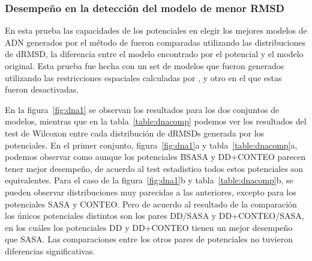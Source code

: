 \subsubsection{Desempeño en la detección del modelo de menor RMSD}
\par
En esta prueba las capacidades de los potenciales en elegir los mejores modelos de ADN generados por el método de \cite{Ibarra2013} fueron comparadas utilizando las distribuciones de dRMSD, la diferencia entre el modelo encontrado por el potencial y el modelo original.
Esta prueba fue hecha con un set de modelos que fueron generados utilizando las restricciones espaciales calculadas por \cite{Ibarra2013}, y otro en el que estas fueron desactivadas.
\par
En la figura~\ref{fig:dna1} se observan los resultados para los dos conjuntos de modelos, mientras que en la tabla~\ref{table:dnacomp} podemos ver los resultados del test de Wilcoxon entre cada distribución de dRMSDs generada por los potenciales.
En el primer conjunto, figura~\ref{fig:dna1}a y tabla~\ref{table:dnacomp}a, podemos observar como aunque los potenciales BSASA y DD+CONTEO parecen tener mejor desempeño, de acuerdo al test estadistico todos estos potenciales son equivalentes.
Para el caso de la figura~\ref{fig:dna1}b y tabla~\ref{table:dnacomp}b, se pueden observar distribuciones muy parecidas a las anteriores, excepto para los potenciales SASA y CONTEO.
Pero de acuerdo al resultado de la comparación los únicos potenciales distintos son los pares DD/SASA y DD+CONTEO/SASA, en los cuáles los potenciales DD y DD+CONTEO tienen un mejor desempeño que SASA.
Las comparaciones entre los otros pares de potenciales no tuvieron diferencias significativas.

